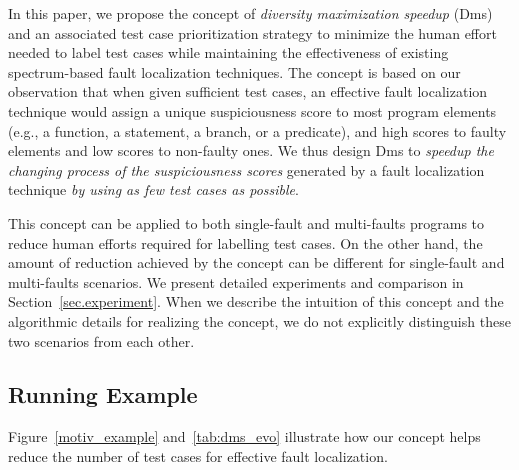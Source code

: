 In this paper, we propose the concept of {\em diversity maximization speedup} ({\sc Dms}) and an associated test case prioritization strategy to minimize the human effort needed to label test cases while maintaining the effectiveness of existing spectrum-based fault localization techniques. The concept is based on our observation that when given sufficient test cases, an effective fault localization technique would assign a unique suspiciousness score to most program elements (e.g., a function, a statement, a branch, or a predicate), and high scores to faulty elements and low scores to non-faulty ones. We thus design {\sc Dms} to {\em speedup the changing process of the suspiciousness scores} generated by a fault localization technique {\em by using as few test cases as possible}.

This concept can be applied to both single-fault and multi-faults programs to reduce human efforts required for labelling test cases. On the other hand, the amount of reduction achieved by the concept can be different for single-fault and multi-faults scenarios. We present detailed experiments and comparison in Section~\ref{sec.experiment}. When we describe the intuition of this concept and the algorithmic details for realizing the concept, we do not explicitly distinguish these two scenarios from each other.

\subsection{Running Example}

Figure~\ref{motiv_example} and~\ref{tab:dms_evo} illustrate how our concept helps reduce the number of test cases for effective fault localization.


